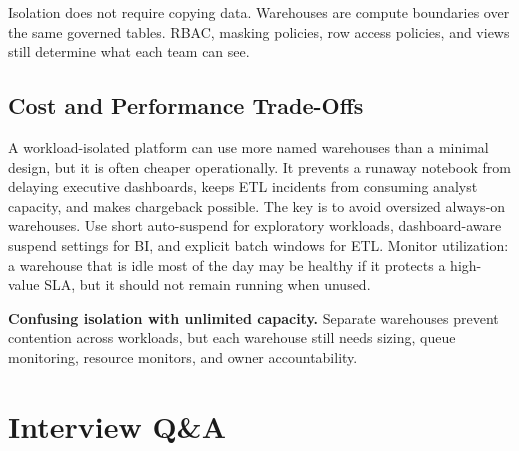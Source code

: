 \begin{notebox}
Isolation does not require copying data. Warehouses are compute boundaries over the same governed tables. RBAC, masking policies, row access policies, and views still determine what each team can see.
\end{notebox}

\subsection{Cost and Performance Trade-Offs}
A workload-isolated platform can use more named warehouses than a minimal design, but it is often cheaper operationally. It prevents a runaway notebook from delaying executive dashboards, keeps ETL incidents from consuming analyst capacity, and makes chargeback possible. The key is to avoid oversized always-on warehouses. Use short auto-suspend for exploratory workloads, dashboard-aware suspend settings for BI, and explicit batch windows for ETL. Monitor utilization: a warehouse that is idle most of the day may be healthy if it protects a high-value SLA, but it should not remain running when unused.

\begin{pitfall}
\textbf{Confusing isolation with unlimited capacity.} Separate warehouses prevent contention across workloads, but each warehouse still needs sizing, queue monitoring, resource monitors, and owner accountability.
\end{pitfall}

\section{Interview Q\&A}
